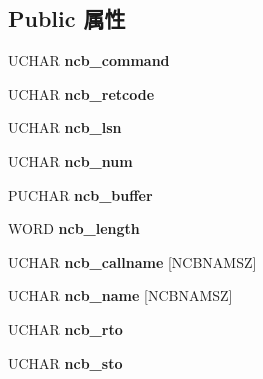\subsection*{Public 属性}
\begin{DoxyCompactItemize}
\item 
\mbox{\label{struct___n_c_b_a9e823a9fa06b0ad5005564993730292e}} 
U\+C\+H\+AR {\bfseries ncb\+\_\+command}
\item 
\mbox{\label{struct___n_c_b_a0dbd7eec389316104fb2fa5c8c1a4610}} 
U\+C\+H\+AR {\bfseries ncb\+\_\+retcode}
\item 
\mbox{\label{struct___n_c_b_af8cdf8f7dc30b66289f4290039a51841}} 
U\+C\+H\+AR {\bfseries ncb\+\_\+lsn}
\item 
\mbox{\label{struct___n_c_b_af382f5489449d330ce96cf2301b777ee}} 
U\+C\+H\+AR {\bfseries ncb\+\_\+num}
\item 
\mbox{\label{struct___n_c_b_a203156a6488c73d08292ce941956943e}} 
P\+U\+C\+H\+AR {\bfseries ncb\+\_\+buffer}
\item 
\mbox{\label{struct___n_c_b_a605d9035984dc5496b22536c8a5a983d}} 
W\+O\+RD {\bfseries ncb\+\_\+length}
\item 
\mbox{\label{struct___n_c_b_a8eb0ad4e97e6c12db9f401ef388f41d8}} 
U\+C\+H\+AR {\bfseries ncb\+\_\+callname} \mbox{[}N\+C\+B\+N\+A\+M\+SZ\mbox{]}
\item 
\mbox{\label{struct___n_c_b_ab0a7462e7a2ebacd81c826c516039f76}} 
U\+C\+H\+AR {\bfseries ncb\+\_\+name} \mbox{[}N\+C\+B\+N\+A\+M\+SZ\mbox{]}
\item 
\mbox{\label{struct___n_c_b_abdc1160edb53a5434cbf02ef9110b63f}} 
U\+C\+H\+AR {\bfseries ncb\+\_\+rto}
\item 
\mbox{\label{struct___n_c_b_a3591034804a6dff3ff20657c70e522ed}} 
U\+C\+H\+AR {\bfseries ncb\+\_\+sto}
\item 
\mbox{\label{struct___n_c_b_a2bb4c9a4cd602d049d5f526b9d27d50d}} 

\end{DoxyCompactItemize}
